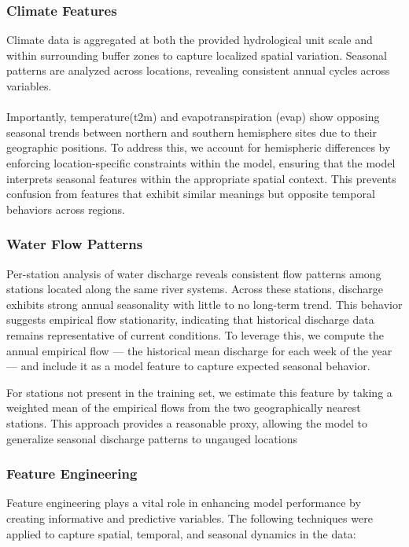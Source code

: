 \documentclass[a4paper,12pt]{article}
\begin{document}
\subsubsection{Climate Features}
Climate data is aggregated at both the provided hydrological unit scale and within surrounding buffer zones to capture localized spatial variation. 
Seasonal patterns are analyzed across locations, revealing consistent annual cycles across variables.
\\ \\
Importantly, temperature(t2m) and evapotranspiration (evap) show opposing seasonal trends between northern and southern 
hemisphere sites due to their geographic positions. To address this, we account for hemispheric differences by enforcing 
location-specific constraints within the model, ensuring that the model interprets seasonal features within the appropriate 
spatial context. This prevents confusion from features that exhibit similar meanings but opposite temporal behaviors across regions.

\subsubsection{Water Flow Patterns}
Per-station analysis of water discharge reveals consistent flow patterns among stations located along the same river systems. 
Across these stations, discharge exhibits strong annual seasonality with little to no long-term trend. This behavior suggests 
empirical flow stationarity, indicating that historical discharge data remains representative of current conditions. To leverage 
this, we compute the annual empirical flow — the historical mean discharge for each week of the year — and include it as a model 
feature to capture expected seasonal behavior.

For stations not present in the training set, we estimate this feature by taking a weighted mean of the empirical flows from the 
two geographically nearest stations. This approach provides a reasonable proxy, allowing the model to generalize seasonal discharge 
patterns to ungauged locations

\subsubsection{Feature Engineering}

Feature engineering plays a vital role in enhancing model performance by creating informative and predictive variables. The following techniques were applied to capture spatial, temporal, and seasonal dynamics in the data:
\end{document}
